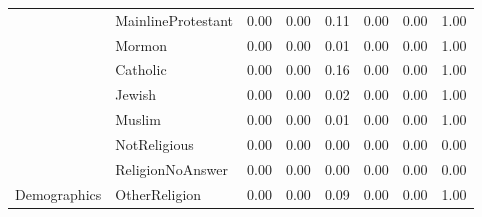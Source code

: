 \begin{table}[!h]
\begin{tabular}[t]{llrrrrrr}
\cmidrule{2-8}
 & MainlineProtestant & 0.00 & 0.00 & 0.11 & 0.00 & 0.00 & 1.00\\
\cmidrule{2-8}
 & Mormon & 0.00 & 0.00 & 0.01 & 0.00 & 0.00 & 1.00\\
\cmidrule{2-8}
 & Catholic & 0.00 & 0.00 & 0.16 & 0.00 & 0.00 & 1.00\\
\cmidrule{2-8}
 & Jewish & 0.00 & 0.00 & 0.02 & 0.00 & 0.00 & 1.00\\
\cmidrule{2-8}
 & Muslim & 0.00 & 0.00 & 0.01 & 0.00 & 0.00 & 1.00\\
\cmidrule{2-8}
 & NotReligious & 0.00 & 0.00 & 0.00 & 0.00 & 0.00 & 0.00\\
\cmidrule{2-8}
 & ReligionNoAnswer & 0.00 & 0.00 & 0.00 & 0.00 & 0.00 & 0.00\\
\cmidrule{2-8}
\multirow{-27}{*}{\raggedright\arraybackslash Demographics} & OtherReligion & 0.00 & 0.00 & 0.09 & 0.00 & 0.00 & 1.00\\
\bottomrule
\end{tabular}
\end{table}
